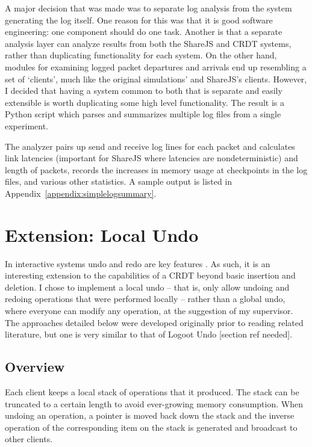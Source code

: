 \documentclass[12pt,a4paper,twoside,openright]{report}
\begin{document}
	A major decision that was made was to separate log analysis from the system generating the log itself. One reason for this was that it is good software engineering: one component should do one task. Another is that a separate analysis layer can analyze results from both the ShareJS and CRDT systems, rather than duplicating functionality for each system. On the other hand, modules for examining logged packet departures and arrivals end up resembling a set of `clients', much like the original simulations' and ShareJS's clients. However, I decided that having a system common to both that is separate and easily extensible is worth duplicating some high level functionality. The result is a Python script which parses and summarizes multiple log files from a single experiment.
	
	The analyzer pairs up send and receive log lines for each packet and calculates link latencies (important for ShareJS where latencies are nondeterministic) and length of packets, records the increases in memory usage at checkpoints in the log files, and various other statistics. A sample output is listed in Appendix~\ref{appendix:simplelogsummary}.	
	
	
	
\section{Extension: Local Undo}
	
	In interactive systems undo and redo are key features \cite{shneiderman1982}. As such, it is an interesting extension to the capabilities of a CRDT beyond basic insertion and deletion. I chose to implement a local undo -- that is, only allow undoing and redoing operations that were performed locally -- rather than a global undo, where everyone can modify any operation, at the suggestion of my supervisor. The approaches detailed below were developed originally prior to reading related literature, but one is very similar to that of Logoot Undo [section ref needed].
	
	\subsection{Overview}
	Each client keeps a local stack of operations that it produced. The stack can be truncated to a certain length to avoid ever-growing memory consumption. When undoing an operation, a pointer is moved back down the stack and the inverse operation of the corresponding item on the stack is generated and broadcast to other clients.
	
\end{document}
